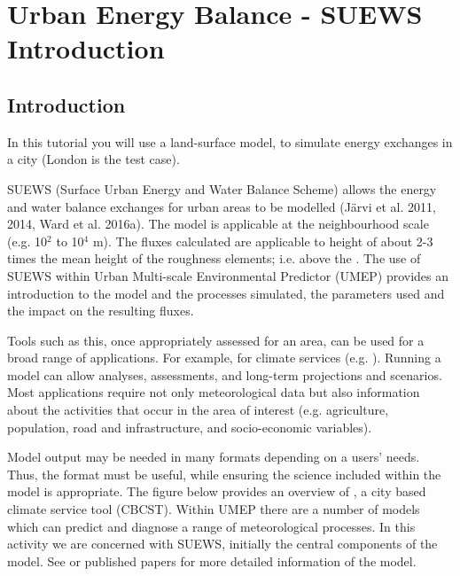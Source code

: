 \documentclass[letterpaper,10pt,english]{sphinxmanual}
\begin{document}
\section{Urban Energy Balance - SUEWS Introduction}
\label{\detokenize{Tutorials/IntroductionToSuews:urban-energy-balance-suews-introduction}}\label{\detokenize{Tutorials/IntroductionToSuews:introductiontosuews}}\label{\detokenize{Tutorials/IntroductionToSuews::doc}}

\subsection{Introduction}
\label{\detokenize{Tutorials/IntroductionToSuews:introduction}}
In this tutorial you will use a land-surface model,
 to simulate energy
exchanges in a city (London is the test case).

SUEWS (Surface Urban Energy and Water Balance Scheme) allows the energy
and water balance exchanges for urban areas to be modelled (Järvi et al.
2011, 2014, Ward et al. 2016a). The model is applicable at the
neighbourhood scale (e.g. 10$^{\text{2}}$ to 10$^{\text{4}}$ m). The fluxes
calculated are applicable to height of about 2-3 times the mean height
of the roughness elements; i.e. above the . The use
of SUEWS within Urban Multi-scale Environmental Predictor (UMEP)
provides an introduction to the model and the processes simulated, the
parameters used and the impact on the resulting fluxes.

Tools such as this, once appropriately assessed for an area, can be used
for a broad range of applications. For example, for climate services
(e.g. ). Running a model can allow analyses,
assessments, and long-term projections and scenarios. Most applications
require not only meteorological data but also information about the
activities that occur in the area of interest (e.g. agriculture,
population, road and infrastructure, and socio-economic variables).

Model output may be needed in many formats depending on a users’ needs.
Thus, the format must be useful, while ensuring the science included
within the model is appropriate. The figure below provides an overview of
{\hyperref[\detokenize{index:index-page}]{}}, a city based climate
service tool (CBCST). Within UMEP there are a number of models which can
predict and diagnose a range of meteorological processes. In this
activity we are concerned with SUEWS, initially the central components
of the model. See  or
published papers for more detailed information of the model.
\end{document}
